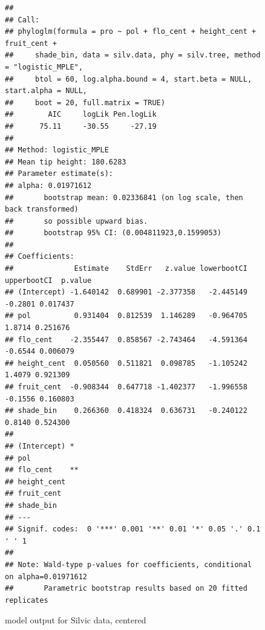 \documentclass{article}\usepackage[]{graphicx}\usepackage[]{color}
\makeatletter
\newenvironment{kframe}{%
 \def\at@end@of@kframe{}%
 \ifinner\ifhmode%
  \def\at@end@of@kframe{\end{minipage}}%
  \begin{minipage}{\columnwidth}%
 \fi\fi%
 \def\FrameCommand##1{\hskip\@totalleftmargin \hskip-\fboxsep
 \colorbox{shadecolor}{##1}\hskip-\fboxsep
     \hskip-\linewidth \hskip-\@totalleftmargin \hskip\columnwidth}%
 \MakeFramed {\advance\hsize-\width
   \@totalleftmargin\z@ \linewidth\hsize
   \@setminipage}}%
 {\par\unskip\endMakeFramed%
 \at@end@of@kframe}
\newenvironment{knitrout}{}{} %
\makeatother
\begin{document}
\begin{figure}[h!]
\begin{knitrout}
\color{fgcolor}\begin{kframe}
\begin{verbatim}
## 
## Call:
## phyloglm(formula = pro ~ pol + flo_cent + height_cent + fruit_cent + 
##     shade_bin, data = silv.data, phy = silv.tree, method = "logistic_MPLE", 
##     btol = 60, log.alpha.bound = 4, start.beta = NULL, start.alpha = NULL, 
##     boot = 20, full.matrix = TRUE)
##        AIC     logLik Pen.logLik 
##      75.11     -30.55     -27.19 
## 
## Method: logistic_MPLE
## Mean tip height: 180.6283
## Parameter estimate(s):
## alpha: 0.01971612 
##       bootstrap mean: 0.02336841 (on log scale, then back transformed)
##       so possible upward bias.
##       bootstrap 95% CI: (0.004811923,0.1599053)
## 
## Coefficients:
##              Estimate    StdErr   z.value lowerbootCI upperbootCI  p.value
## (Intercept) -1.640142  0.689901 -2.377358   -2.445149     -0.2801 0.017437
## pol          0.931404  0.812539  1.146289   -0.964705      1.8714 0.251676
## flo_cent    -2.355447  0.858567 -2.743464   -4.591364     -0.6544 0.006079
## height_cent  0.050560  0.511821  0.098785   -1.105242      1.4079 0.921309
## fruit_cent  -0.908344  0.647718 -1.402377   -1.996558     -0.1556 0.160803
## shade_bin    0.266360  0.418324  0.636731   -0.240122      0.8140 0.524300
##               
## (Intercept) * 
## pol           
## flo_cent    **
## height_cent   
## fruit_cent    
## shade_bin     
## ---
## Signif. codes:  0 '***' 0.001 '**' 0.01 '*' 0.05 '.' 0.1 ' ' 1
## 
## Note: Wald-type p-values for coefficients, conditional on alpha=0.01971612
##       Parametric bootstrap results based on 20 fitted replicates
\end{verbatim}
\end{kframe}
\end{knitrout}
\caption{model output for Silvic data, centered}
\end{figure}
\end{document}
